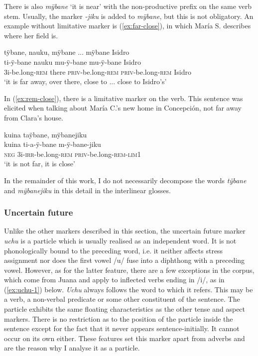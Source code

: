 There is also \textit{mÿbane} ‘it is near’ with the non-productive  prefix on the same verb stem. Usually, the  marker \textit{-jiku} is added to \textit{mÿbane}, but this is not obligatory. An example without limitative marker is (\ref{ex:far-close}), in which María S. describes where her field is.

\newpage
\ea\label{ex:far-close}
\begingl 
\glpreamble tÿbane, nauku, mÿbane ... mÿbane Isidro\\
\gla ti-ÿ-bane nauku mu-ÿ-bane mu-ÿ-bane Isidro\\ 
\glb 3i-be.long-\textsc{rem} there \textsc{priv}-be.long-\textsc{rem} \textsc{priv}-be.long-\textsc{rem} Isidro\\ 
\glft ‘it is far away, over there, close to ... close to Isidro’s’
\trailingcitation{[rxx-e120511l.393-394]}
\xe

In (\ref{ex:rem-close}), there is a limitative marker on the verb. This sentence was elicited when talking about María C.’s new home in Concepción, not far away from Clara’s house.

\ea\label{ex:rem-close}
\begingl
\glpreamble kuina taÿbane, mÿbanejiku\\
\gla kuina ti-a-ÿ-bane m-ÿ-bane-jiku\\
\glb \textsc{neg} 3i-\textsc{irr}-be.long-\textsc{rem} \textsc{priv}-be.long-\textsc{rem}-\textsc{lim}1\\
\glft ‘it is not far, it is close’
\endgl
\trailingcitation{[cux-120410ls.065]}
\xe

In the remainder of this work, I do not necessarily decompose the words \textit{tÿbane} and \textit{mÿbanejiku} in this detail in the interlinear glosses.


\subsubsection{Uncertain future}\label{sec:UncertainFuture}

Unlike the other markers described in this section, the uncertain future marker \textit{uchu} is a particle which is usually realised as an independent word. It is not phonologically bound to the preceding word, i.e. it neither affects stress assignment nor does the first vowel /u/ fuse into a diphthong with a preceding vowel. However, as for the latter feature, there are a few exceptions in the corpus, which come from Juana and apply to inflected verbs ending in /i/, as in  (\ref{ex:uchu-1}) below. \textit{Uchu} always follows the word to which it refers. This may be a verb, a non-verbal predicate or some other constituent of the sentence. The particle exhibits the same floating characteristics as the other tense and aspect markers. There is no restriction as to the position of the particle inside the sentence except for the fact that it never appears sentence-initially. It cannot occur on its own either. These features set this marker apart from adverbs and are the reason why I analyse it as a particle.

